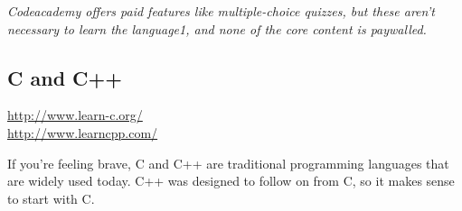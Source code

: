 		\footnotesize \textit{Codeacademy offers paid features like multiple-choice quizzes, but these aren't necessary to learn the language1, and none of the core content is paywalled.} \normalsize
	
		\subsection*{C and C++}
		
		\url{http://www.learn-c.org/}
		\\ \url{http://www.learncpp.com/}
		
		If you're feeling brave, C and C++ are traditional programming languages that are widely used today. C++ was designed to follow on from C, so it makes sense to start with C.